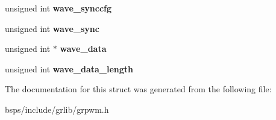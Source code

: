 \begin{DoxyCompactItemize}
unsigned int {\bfseries wave\+\_\+synccfg}
\item 
\mbox{\label{structgrpwm__ioctl__config_a8becce526edf47850ce2da9b49e9f7f4}} 
unsigned int {\bfseries wave\+\_\+sync}
\item 
\mbox{\label{structgrpwm__ioctl__config_a5bda7d98e87426ea6f24fa56d79dc3ed}} 
unsigned int $\ast$ {\bfseries wave\+\_\+data}
\item 
\mbox{\label{structgrpwm__ioctl__config_a0fc54c5808374579caddd2c9dd5fc81c}} 
unsigned int {\bfseries wave\+\_\+data\+\_\+length}
\end{DoxyCompactItemize}


The documentation for this struct was generated from the following file\+:\begin{DoxyCompactItemize}
\item 
bsps/include/grlib/grpwm.\+h\end{DoxyCompactItemize}
